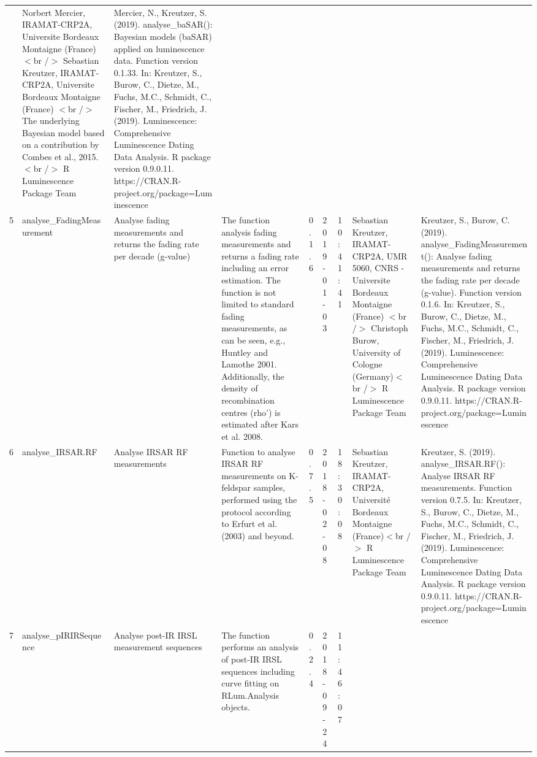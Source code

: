 \begin{table}[ht]
\begin{tabular}{rllllllll}
 & Norbert Mercier, IRAMAT-CRP2A, Universite Bordeaux Montaigne (France)  $<$br /$>$ Sebastian Kreutzer, IRAMAT-CRP2A, Universite Bordeaux Montaigne (France)  $<$br /$>$ The underlying Bayesian model based on a contribution by Combes et al., 2015.$<$br /$>$  R Luminescence Package Team & Mercier, N., Kreutzer, S. (2019). analyse\_baSAR(): Bayesian models (baSAR) applied on luminescence data. Function version 0.1.33. In: Kreutzer, S., Burow, C., Dietze, M., Fuchs, M.C., Schmidt, C., Fischer, M., Friedrich, J. (2019). Luminescence: Comprehensive Luminescence Dating Data Analysis. R package version 0.9.0.11. https://CRAN.R-project.org/package=Luminescence
 \\ 
  5 & analyse\_FadingMeasurement & Analyse fading measurements and returns the fading rate per decade (g-value) & The function analysis fading measurements and returns a fading rate including an error estimation. The function is not limited to standard fading measurements, as can be seen, e.g., Huntley and Lamothe 2001. Additionally, the density of recombination centres (rho') is estimated after Kars et al. 2008. & 0.1.6 & 2019-01-03 & 10:41:41
 & Sebastian Kreutzer, IRAMAT-CRP2A, UMR 5060, CNRS - Universite Bordeaux Montaigne (France)  $<$br /$>$ Christoph Burow, University of Cologne (Germany)$<$br /$>$  R Luminescence Package Team & Kreutzer, S., Burow, C. (2019). analyse\_FadingMeasurement(): Analyse fading measurements and returns the fading rate per decade (g-value). Function version 0.1.6. In: Kreutzer, S., Burow, C., Dietze, M., Fuchs, M.C., Schmidt, C., Fischer, M., Friedrich, J. (2019). Luminescence: Comprehensive Luminescence Dating Data Analysis. R package version 0.9.0.11. https://CRAN.R-project.org/package=Luminescence
 \\ 
  6 & analyse\_IRSAR.RF & Analyse IRSAR RF measurements & Function to analyse IRSAR RF measurements on K-feldspar samples, performed using the protocol according to Erfurt et al. (2003) and beyond. & 0.7.5 & 2018-02-08 & 18:30:08
 & Sebastian Kreutzer, IRAMAT-CRP2A, Université Bordeaux Montaigne (France)$<$br /$>$  R Luminescence Package Team & Kreutzer, S. (2019). analyse\_IRSAR.RF(): Analyse IRSAR RF measurements. Function version 0.7.5. In: Kreutzer, S., Burow, C., Dietze, M., Fuchs, M.C., Schmidt, C., Fischer, M., Friedrich, J. (2019). Luminescence: Comprehensive Luminescence Dating Data Analysis. R package version 0.9.0.11. https://CRAN.R-project.org/package=Luminescence
 \\ 
  7 & analyse\_pIRIRSequence & Analyse post-IR IRSL measurement sequences & The function performs an analysis of post-IR IRSL sequences including curve fitting on  RLum.Analysis  objects. & 0.2.4 & 2018-09-24 & 11:46:07

\end{tabular}
\end{table}
